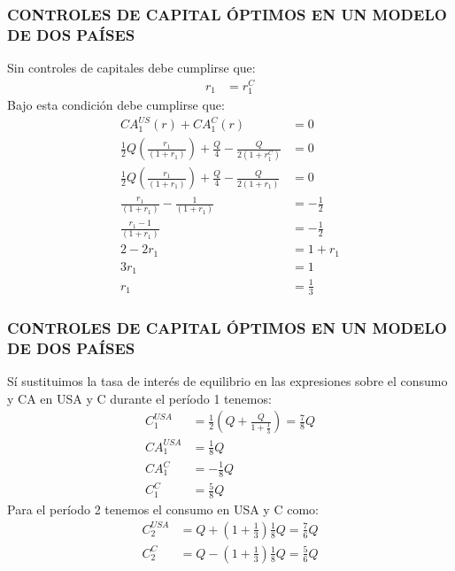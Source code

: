 \documentclass[10pt, xcolor=table, x11names]{beamer}
\begin{document}
\begin{frame}[label=9]
	\frametitle{{\normalsize CONTROLES DE CAPITAL ÓPTIMOS EN UN MODELO DE DOS PAÍSES} {}}
	Sin controles de capitales debe cumplirse que:
	\begin{align}
	r_{1}&=r_{1}^{C}
	\end{align}
	Bajo esta condición debe cumplirse que:
	\begin{align}
	CA_{1}^{US}(r)+CA_{1}^{C}(r)&=0\nonumber \\
	\frac{1}{2}Q(\frac{r_{1}}{(1+r_{1})})+\frac{Q}{4}-\frac{Q}{2(1+r_{1}^{C})}				&=0\nonumber \\
	\frac{1}{2}Q(\frac{r_{1}}{(1+r_{1})})+\frac{Q}{4}-\frac{Q}{2(1+r_{1})}					&=0\nonumber \\
	\frac{r_{1}}{(1+r_{1})}-\frac{1}{(1+r_{1})}												&=-\frac{1}{2}\nonumber \\
	\frac{r_{1}-1}{(1+r_{1})}	&=-\frac{1}{2}\nonumber \\
	2-2r_{1}					&=1+r_{1}\nonumber \\
	3r_{1}					&=1\nonumber \\
	r_{1}					&=\frac{1}{3}\nonumber 
\end{align}
\end{frame}

\begin{frame}[label=10]
	\frametitle{{\normalsize CONTROLES DE CAPITAL ÓPTIMOS EN UN MODELO DE DOS PAÍSES} {}}
	Sí sustituimos la tasa de interés de equilibrio en las expresiones sobre el consumo y CA en USA y C durante el período 1 tenemos:
	\begin{align}
	C_{1}^{USA}&= \frac{1}{2}(Q+\frac{Q}{1+\frac{1}{3}})=\frac{7}{8}Q\\
	CA_{1}^{USA}&= \frac{1}{8}Q\\
	CA_{1}^{C}&= -\frac{1}{8}Q\\
	C_{1}^{C}&= \frac{5}{8}Q
	\end{align}
	Para el período 2 tenemos el consumo en USA y C como:
	\begin{align}
	C_{2}^{USA}&= Q+(1+\frac{1}{3})\frac{1}{8}Q=\frac{7}{6}Q\\
	C_{2}^{C}&= Q-(1+\frac{1}{3})\frac{1}{8}Q=\frac{5}{6}Q
	\end{align}
\end{frame}
\end{document}
